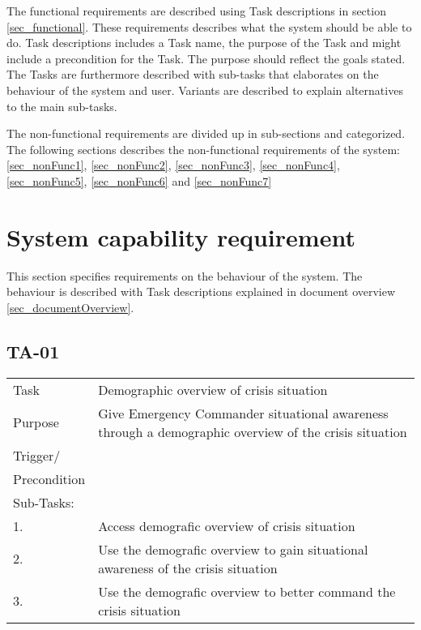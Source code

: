 The functional requirements are described using Task descriptions in section \ref{sec_functional}. These requirements describes what the system should be able to do. Task descriptions includes a Task name, the purpose of the Task and might include a precondition for the Task. The purpose should reflect the goals stated. The Tasks are furthermore described with sub-tasks that elaborates on the behaviour of the system and user.  Variants are described to explain alternatives to the main sub-tasks. \citep{taskDescription}

The non-functional requirements are divided up in sub-sections and categorized. The following sections describes the non-functional requirements of the system: \ref{sec_nonFunc1}, \ref{sec_nonFunc2}, \ref{sec_nonFunc3}, \ref{sec_nonFunc4}, \ref{sec_nonFunc5}, \ref{sec_nonFunc6} and \ref{sec_nonFunc7} 
 


\newpage
\label{sec_functional}
\section{System capability requirement}
This section specifies requirements on the behaviour of the system. The behaviour is described with Task descriptions explained in document overview \ref{sec_documentOverview}.

\subsection{TA-01}
\begin{longtable}{| p{2.5cm}  | p{10cm} |  }
	\hline
	Task & Demographic overview of crisis situation  \\
	Purpose &  Give Emergency Commander situational awareness through a demographic overview of the crisis situation \\
	Trigger/ &  \\ Precondition &  \\
	\hline
	Sub-Tasks: & \\
	1. & Access demografic overview of crisis situation \\
	\hline
	2. & Use the demografic overview to gain situational awareness of the crisis situation \\
	\hline
	3. & Use the demografic overview to better command the crisis situation \\
	\hline
\end{longtable}


